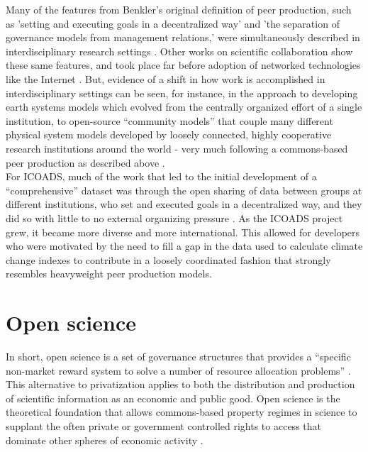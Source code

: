 \documentclass[thesis,tocnosub,noragright,centerchapter,12pt]{uiucecethesis09}
\begin{document}
Many of the features from Benkler's original definition of peer production, such as 'setting and executing goals in a decentralized way' and 'the separation of governance models from management relations,' were simultaneously described in interdisciplinary research settings \citep{palmer2001work}. Other works on scientific collaboration  show these same features, and took place far before adoption of networked technologies like the Internet \citep{galison1997image}. But, evidence of a shift in how work is accomplished in interdisciplinary settings can be seen, for instance, in the approach to developing earth systems models which evolved from the centrally organized effort of a single institution, to open-source ``community models'' that couple many different physical system models developed by loosely connected, highly cooperative research institutions around the world -
very much following a commons-based peer production as described
above  \citep{edwards2010vast, voinov2010community}.\\

For ICOADS, much of the work that led to the initial development of a
``comprehensive'' dataset was through the open sharing of data between
groups at different institutions, who set and executed goals in a
decentralized way, and they did so with little to no external
organizing pressure \citep{slutz1985comprehensive}. As the ICOADS project grew,
it became more diverse and more international. This allowed for developers who
were motivated by the need to fill a gap in the data used to calculate
climate change indexes to contribute in a loosely coordinated fashion
that strongly resembles heavyweight peer production models.\\

\section{Open science}

In short, open science is a set of governance structures that provides a
``specific non-market reward system to solve a number of resource
allocation problems'' \citep{david2003economic}. This alternative to privatization
applies to both the distribution and production of scientific information as an
economic and public good. Open science is the theoretical foundation
that allows commons-based property regimes in science to supplant the often private
or government controlled rights to access that dominate other spheres of
economic activity \citep{david2004understanding}.\\
\end{document}
